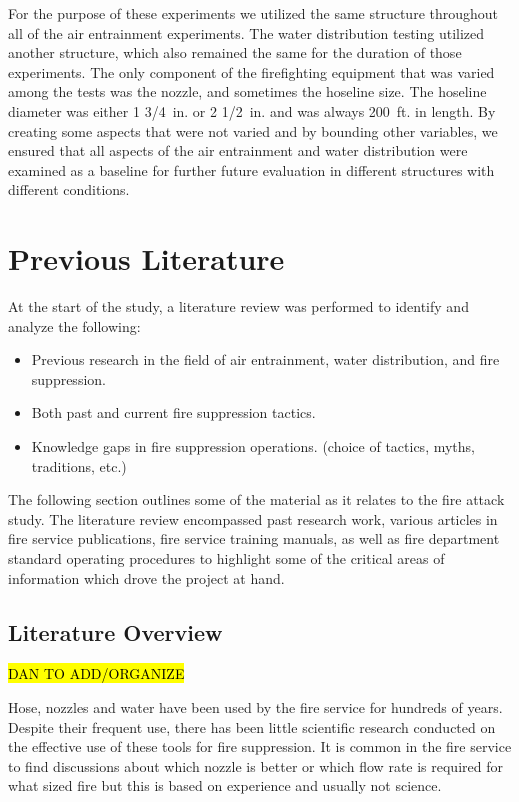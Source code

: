 \documentclass{article}
\begin{document}
For the purpose of these experiments we utilized the same structure throughout all of the air entrainment experiments. The water distribution testing utilized another structure, which also remained the same for the duration of those experiments. The only component of the firefighting equipment that was varied among the tests was the nozzle, and sometimes the hoseline size. The hoseline diameter was either 1 3/4~in. or 2 1/2~in. and was always 200~ft. in length. By creating some aspects that were not varied and by bounding other variables, we ensured that all aspects of the air entrainment and water distribution were examined as a baseline for further future evaluation in different structures with different conditions.

\clearpage

\section{Previous Literature}

At the start of the study, a literature review was performed to identify and analyze the following:

\begin{itemize}
	\item Previous research in the field of air entrainment, water distribution, and fire suppression.
	\item Both past and current fire suppression tactics.
	\item Knowledge gaps in fire suppression operations. (choice of tactics, myths, traditions, etc.) 
\end{itemize}

The following section outlines some of the material as it relates to the fire attack study. The literature review encompassed past research work, various articles in fire service publications, fire service training manuals, as well as fire department standard operating procedures to highlight some of the critical areas of information which drove the project at hand.

\subsection{Literature Overview}

\hl{DAN TO ADD/ORGANIZE}

Hose, nozzles and water have been used by the fire service for hundreds of years. Despite their frequent use, there has been little scientific research conducted on the effective use of these tools for fire suppression. It is common in the fire service to find discussions about which nozzle is better or which flow rate is required for what sized fire but this is based on experience and usually not science. 
\end{document}
